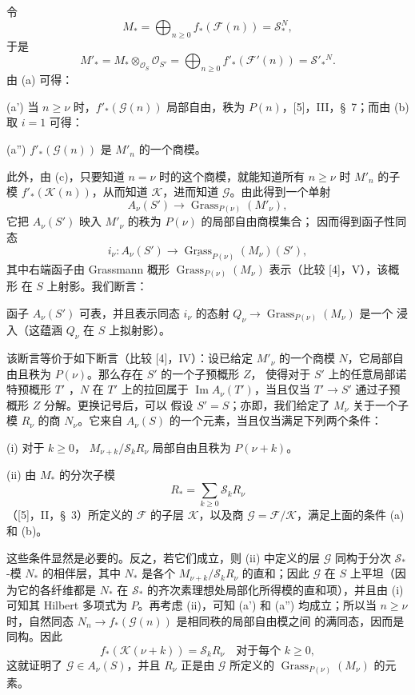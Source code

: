 令
\[
M_* =\bigoplus_{n\geq0}f_*(\mathcal F(n))=\mathcal S_*^{N},
\]
于是
\[
M'_* =M_*\otimes_{\mathcal O_S}\mathcal O_{S'}
=\bigoplus_{n\geq0}f'_*(\mathcal F'(n))=\mathcal S'_*{}^{N}.
\]
由 (a) 可得：

\noindent (a') 当 $n\geq\nu$ 时，$f'_*(\mathcal G(n))$ 局部自由，秩为
$P(n)$，[5]，III，\S~7；而由 (b) 取 $i=1$ 可得：

\noindent (a'') $f'_*(\mathcal G(n))$ 是 $M'_n$ 的一个商模。

此外，由 (c)，只要知道 $n=\nu$ 时的这个商模，就能知道所有
$n\geq\nu$ 时 $M'_n$ 的子模 $f'_*(\mathcal K(n))$，从而知道
$\mathcal K$，进而知道 $\mathcal G$。由此得到一个单射
\[
A_\nu(S')\longrightarrow\operatorname{Grass}_{P(\nu)}(M'_\nu),
\]
它把 $A_\nu(S')$ 映入 $M'_\nu$ 的秩为 $P(\nu)$ 的局部自由商模集合；
因而得到函子性同态
\[
i_\nu:A_\nu(S')\longrightarrow
\underline{\operatorname{Grass}}_{P(\nu)}(M_\nu)(S'),
\]
其中右端函子由 Grassmann 概形
$\operatorname{Grass}_{P(\nu)}(M_\nu)$ 表示（比较 [4]，V），该概形
在 $S$ 上射影。我们断言：

 函子 $A_\nu(S')$ 可表，并且表示同态 $i_\nu$ 的态射
$Q_\nu\longrightarrow\operatorname{Grass}_{P(\nu)}(M_\nu)$ 是一个
浸入（这蕴涵 $Q_\nu$ 在 $S$ 上拟射影）。

该断言等价于如下断言（比较 [4]，IV）：设已给定 $M'_\nu$ 的一个商模
$N$，它局部自由且秩为 $P(\nu)$。那么存在 $S'$ 的一个子预概形 $Z$，
使得对于 $S'$ 上的任意局部诺特预概形 $T'$
，$N$ 在 $T'$ 上的拉回属于 $\operatorname{Im}A_\nu(T')$，当且仅当
$T'\longrightarrow S'$ 通过子预概形 $Z$ 分解。更换记号后，可以
假设 $S'=S$；亦即，我们给定了 $M_\nu$ 关于一个子模 $R_\nu$ 的商
$N_\nu$。它来自 $A_\nu(S)$ 的一个元素，当且仅当满足下列两个条件：

\medskip
\noindent (i) 对于 $k\geq0$，
$M_{\nu+k}/\mathcal S_kR_\nu$ 局部自由且秩为 $P(\nu+k)$。

\smallskip
\noindent (ii) 由 $M_*$ 的分次子模
\[
R_* =\sum_{k\geq0}\mathcal S_kR_\nu
\]
（[5]，II，\S~3）所定义的 $\mathcal F$ 的子层 $\mathcal K$，以及商
$\mathcal G=\mathcal F/\mathcal K$，满足上面的条件 (a) 和 (b)。

这些条件显然是必要的。反之，若它们成立，则 (ii) 中定义的层
$\mathcal G$ 同构于分次 $\mathcal S_*$-模 $N_*$ 的相伴层，其中
$N_*$ 是各个 $M_{\nu+k}/\mathcal S_kR_\nu$ 的直和；因此
$\mathcal G$ 在 $S$ 上平坦（因为它的各纤维都是 $N_*$ 在
$\mathcal S_*$ 的齐次素理想处局部化所得模的直和项），并且由 (i)
可知其 Hilbert 多项式为 $P$。再考虑 (ii)，可知 (a') 和 (a'')
均成立；所以当 $n\geq\nu$ 时，自然同态
$N_n\longrightarrow f_*(\mathcal G(n))$ 是相同秩的局部自由模之间
的满同态，因而是同构。因此
\[
f_*(\mathcal K(\nu+k))=\mathcal S_kR_\nu
\quad\text{对于每个 $k\geq0$},
\]
这就证明了 $\mathcal G\in A_\nu(S)$，并且 $R_\nu$ 正是由
$\mathcal G$ 所定义的
$\operatorname{Grass}_{P(\nu)}(M_\nu)$ 的元素。

